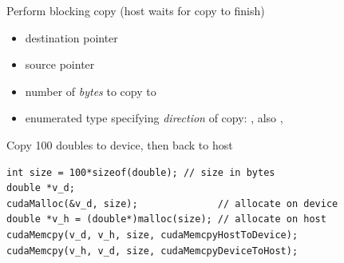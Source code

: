 \begin{frame}[fragile]{}
    \begin{info}{Perform blocking copy (host waits for copy to finish)}
        \centering {}
    \begin{itemize}
        \item {} destination pointer
        \item {} source pointer
        \item {} number of \emph{bytes} to copy to 
        \item {} enumerated type specifying \emph{direction} of copy:
            , also , 
    \end{itemize}
    \end{info}

    \begin{code}{Copy 100 doubles to device, then back to host}
        \begin{lstlisting}[style=boxcuda]
int size = 100*sizeof(double); // size in bytes
double *v_d;
cudaMalloc(&v_d, size);              // allocate on device
double *v_h = (double*)malloc(size); // allocate on host
cudaMemcpy(v_d, v_h, size, cudaMemcpyHostToDevice);
cudaMemcpy(v_h, v_d, size, cudaMemcpyDeviceToHost);
\end{lstlisting}
    \end{code}
\end{frame}

